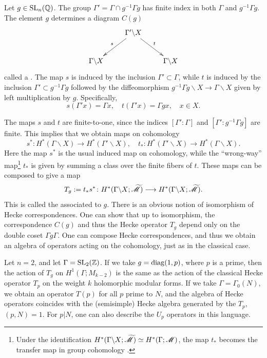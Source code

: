 \subsection{}\label{hecke.ops}
%
Let $g\in \operatorname{SL}_{n} (\mathbb{Q})$.   The group $\Gamma ' = \Gamma \cap
g^{-1}\Gamma g$ has finite index in both $\Gamma$ and $g^{-1}\Gamma
g$.  The element $g$ determines a diagram $C (g)$
\[
\xymatrix{&{\Gamma'\backslash X}\ar[dl]_{s}\ar[dr]^{t}&\\
 {\Gamma\backslash X}&&{\Gamma\backslash X}}
\]
called a .  The map $s$ is induced by the
inclusion $\Gamma '\subset \Gamma$, while $t$ is induced by the
inclusion $\Gamma '\subset g^{-1}\Gamma g$ followed by the
diffeomorphism $g^{-1}\Gamma g\backslash X\rightarrow \Gamma
\backslash X$ given by left multiplication by $g$.  Specifically, 
\[
s (\Gamma 'x) = \Gamma x, \quad t (\Gamma 'x) = \Gamma gx, \quad x\in X.
\]

The maps $s$ and $t$ are finite-to-one, since the indices $[\Gamma
':\Gamma]$ and $[\Gamma ':g^{-1}\Gamma g]$ are finite.   This implies
that we obtain maps on cohomology 
\[
s^{*}\colon H^{*} (\Gamma \backslash X) \rightarrow
H^{*} (\Gamma' \backslash X), \quad t_{*}\colon H^{*} (\Gamma' \backslash X) \rightarrow
H^{*} (\Gamma \backslash X).
\]
Here the map $s^{*}$ is the usual induced map on cohomology, while the
``wrong-way'' map\footnote{Under the identification $H^{*} (\Gamma
\backslash X; \widetilde{\mathscr M})\simeq H^{*} (\Gamma ;\mathscr M)$, the map
$t_{*}$ becomes the transfer map in group cohomology
\cite[III.9]{brown}.} $t_{*}$ is given by summing a class over the finite
fibers of $t$.  These maps can be composed to give a map
\[
T_{g} := t_{*}s^{*}\colon H^{*} (\Gamma \backslash X;
\widetilde{\mathscr M})\longrightarrow  H^{*} (\Gamma \backslash X;
\widetilde{\mathscr M}).
\]
This is called the  associated to $g$.  There is
an obvious notion of isomorphism of Hecke correspondences.  One can
show that up to isomorphism, the correspondence $C (g)$ and thus the
Hecke operator $T_{g}$ depend only on the double coset $\Gamma
g\Gamma$.  One can compose Hecke correspondences, and thus we obtain
an algebra of operators acting on the cohomology, just as in the
classical case.

\begin{example}
Let $n=2$, and let $\Gamma = \operatorname{SL}_{2} (\mathbb{Z})$.  If we take $g=\operatorname{diag}
(1,p)$, where $p$ is a prime, then the action of $T_{g}$ on $H^{1}
(\Gamma ; M_{k-2})$ is the same as the action of the classical Hecke
operator $T_{p}$ on the weight $k$ holomorphic modular forms.  If we
take $\Gamma = \Gamma_{0} (N)$, we obtain an operator $T (p)$ for all
$p$ prime to $N$, and the algebra of Hecke operators coincides with
the (semisimple) Hecke algebra generated by the $T_{p}$, $(p,N)=1$.
For $p|N$, one can also describe the $U_{p}$ operators in this language.
\end{example}

